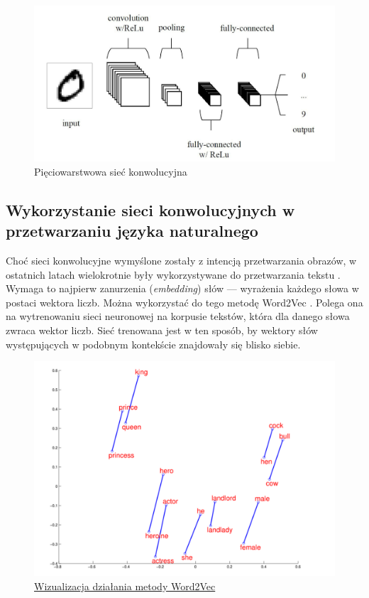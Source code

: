 \begin{figure}[H]
	\centering
	\includegraphics[width=0.8\linewidth]{images/chapter2/layered-conv.pdf}
	\caption{Pięciowarstwowa sieć konwolucyjna \cite{o2015introduction}}
	\label{fig:layered-conv}
\end{figure}

\subsection{Wykorzystanie sieci konwolucyjnych w przetwarzaniu języka naturalnego}
\label{subsec:word2vec}

Choć sieci konwolucyjne wymyślone zostały z intencją przetwarzania obrazów, w ostatnich latach wielokrotnie były wykorzystywane do przetwarzania tekstu \cite{minaee2019deep}. Wymaga to najpierw zanurzenia (\textit{embedding}) słów --- wyrażenia każdego słowa w postaci wektora liczb. Można wykorzystać do tego metodę Word2Vec \cite{mikolov2013efficient}. Polega ona na wytrenowaniu sieci neuronowej na korpusie tekstów, która dla danego słowa zwraca wektor liczb. Sieć trenowana jest w ten sposób, by wektory słów występujących w podobnym kontekście znajdowały się blisko siebie.

\begin{figure}[h]
	\centering
	\includegraphics[width=0.8\linewidth]{images/chapter2/w2vpng.pdf}
	\caption{\href{https://drive.google.com/file/d/0B7XkCwpI5KDYRWRnd1RzWXQ2TWc/edit?resourcekey=0-oGRnY6qG7yWEqCXOHFKPcw}
		{Wizualizacja działania metody Word2Vec}}
	\label{fig:word2vec}
\end{figure}

